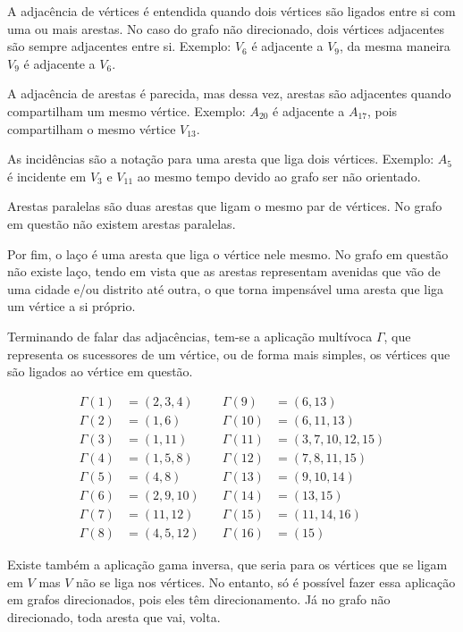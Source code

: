 A adjacência de vértices é entendida quando dois vértices são ligados entre si com uma ou mais arestas.
No caso do grafo não direcionado, dois vértices adjacentes são sempre adjacentes entre si.
Exemplo: $V_6$ é adjacente a $V_9$, da mesma maneira $V_9$ é adjacente a $V_6$.

A adjacência de arestas é parecida, mas dessa vez, arestas são adjacentes quando compartilham um mesmo vértice.
Exemplo: $A_{20}$ é adjacente a $A_{17}$, pois compartilham o mesmo vértice $V_{13}$.

As incidências são a notação para uma aresta que liga dois vértices.
Exemplo: $A_{5}$ é incidente em $V_3$ e $V_{11}$ ao mesmo tempo devido ao grafo ser não orientado.

Arestas paralelas são duas arestas que ligam o mesmo par de vértices.
No grafo em questão não existem arestas paralelas.

Por fim, o laço é uma aresta que liga o vértice nele mesmo.
No grafo em questão não existe laço, tendo em vista que as arestas representam avenidas que vão de uma cidade e/ou distrito até outra, o que torna impensável uma aresta que liga um vértice a si próprio.

Terminando de falar das adjacências, tem-se a aplicação multívoca $\Gamma$, que representa os sucessores de um vértice, ou de forma mais simples, os vértices que são ligados ao vértice em questão.

\[
	\begin{alignedat}{2}
		\Gamma(1) & = (2,3,4)  & \quad \Gamma(9)  & = (6,13)         \\
		\Gamma(2) & = (1,6)    & \quad \Gamma(10) & = (6,11,13)      \\
		\Gamma(3) & = (1,11)   & \quad \Gamma(11) & = (3,7,10,12,15) \\
		\Gamma(4) & = (1,5,8)  & \quad \Gamma(12) & = (7,8,11,15)    \\
		\Gamma(5) & = (4,8)    & \quad \Gamma(13) & = (9,10,14)      \\
		\Gamma(6) & = (2,9,10) & \quad \Gamma(14) & = (13,15)        \\
		\Gamma(7) & = (11,12)  & \quad \Gamma(15) & = (11,14,16)     \\
		\Gamma(8) & = (4,5,12) & \quad \Gamma(16) & = (15)
	\end{alignedat}
\]

Existe também a aplicação gama inversa, que seria para os vértices que se ligam em $V$ mas $V$ não se liga nos vértices.
No entanto, só é possível fazer essa aplicação em grafos direcionados, pois eles têm direcionamento.
Já no grafo não direcionado, toda aresta que vai, volta.

